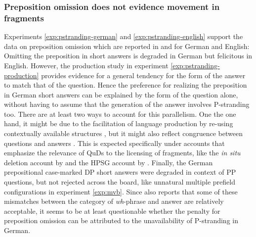 \subsubsection{Preposition omission does not evidence movement in fragments}
Experiments \ref{exp:pstranding-german} and \ref{exp:pstranding-english} support the data on preposition omission which are reported in \citet{merchant2004} and \citet{merchant.etal2013} for German and English: Omitting the preposition in short answers is degraded in German but felicitous in English. However, the production study in experiment \ref{exp:pstranding-production} provides evidence for a general tendency for the form of the answer to match that of the question. Hence the preference for realizing the preposition in German short answers can be explained by the form of the question alone, without having to assume that the generation of the answer involves P-stranding too. There are at least two ways to account for this parallelism. One the one hand, it might be due to the facilitation of language production by re-using contextually available structures \citep{levelt.kelter1982}, but it might also reflect congruence between questions and answers \citep{reich2002a}. This is expected specifically under accounts that emphasize the relevance of QuDs to the licensing of fragments, like the \textit{in situ} deletion account by \citet{reich2007} and the HPSG account by \citet{ginzburg.sag2000}. Finally, the German prepositional case-marked DP short answers were degraded in context of PP questions, but not rejected across the board, like unnatural multiple prefield configurations in experiment \ref{exp:mvb}. Since \citet{lemkeaccepted} also reports that some of these mismatches between the category of \textit{wh}-phrase and answer are relatively acceptable, it seems to be at least questionable whether the penalty for preposition omission can be attributed to the unavailability of P-stranding in German.

